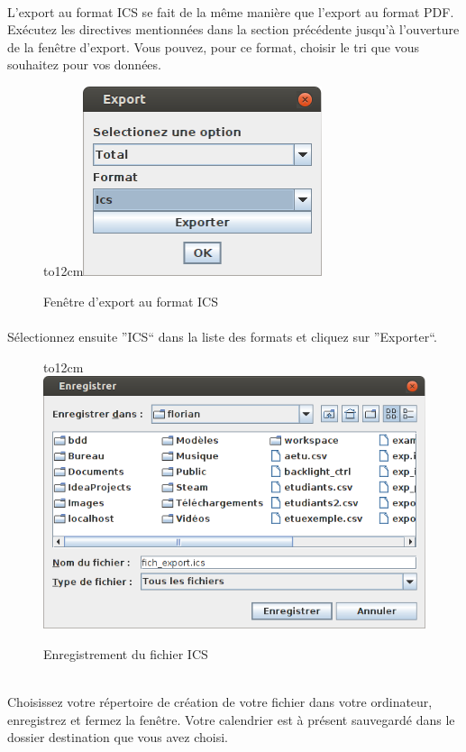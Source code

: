 \documentclass[a4paper,10pt]{report}
\begin{document}
	\paragraph{}
	  L'export au format ICS se fait de la même manière que l'export au format PDF.
	  Exécutez les directives mentionnées dans la section précédente jusqu'à l'ouverture de la fenêtre d'export.
	  Vous pouvez, pour ce format, choisir le tri que vous souhaitez pour vos données.
	  
	  \begin{figure}[H]
	   \hbox to12cm{\hss\includegraphics[width=7cm]{../general/export.png}\hss}
	   \caption{Fenêtre d'export au format ICS}
	 \end{figure}
	  
	  \paragraph{}
	    Sélectionnez ensuite ''ICS`` dans la liste des formats et cliquez sur ''Exporter``.
	  ~\\
	  \begin{figure}[H]
	   \hbox to12cm{\hss\includegraphics[width=14cm]{../general/navigateur.png}\hss}
	   \caption{Enregistrement du fichier ICS}
	 \end{figure}
	  ~\\
	  Choisissez votre répertoire de création de votre fichier dans votre ordinateur, enregistrez  et fermez la fenêtre.
	  Votre calendrier est à présent sauvegardé dans le dossier destination que vous avez choisi.
	  
\end{document}
